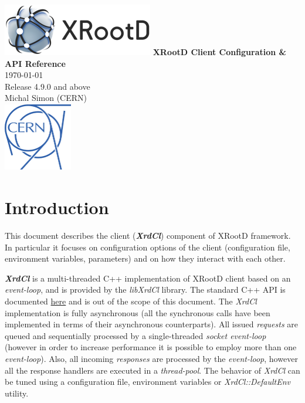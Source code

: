 \documentclass{article}
\begin{document}
\begin{titlepage}

    \centering
    \vfill
    	\includegraphics{xrootd-logo.png}
    \vfill
    	{\huge \textbf{XRootD Client Configuration \& API Reference} \\}
        \vskip3cm
        \today \\
        Release 4.9.0 and above \\
        Michal Simon (CERN) \\
        \vskip0.2cm
        \includegraphics[width=3cm, height=3cm]{cern-logo.png}
    \vfill
    \vfill

\end{titlepage}

\tableofcontents

\newpage

\section{Introduction}
    
    This document describes the client (\textit{\textbf{XrdCl}}) component of XRootD framework. In particular it focuses
    on configuration options of the client (configuration file, environment variables, parameters) and on how they
    interact with each other.
    
    \textit{\textbf{XrdCl}} is a multi-threaded C++ implementation of XRootD client based on an \textit{event-loop}, and is provided 
    by the \textit{libXrdCl} library. The standard C++ API is documented \href{http://xrootd.org/doc/doxygen/current/html/annotated.html}
	{here} and is out of the scope of this document. The \textit{XrdCl} implementation is fully asynchronous (all the synchronous 
	calls have been implemented in terms of their asynchronous counterparts). All issued \textit{requests} are queued and sequentially 
	processed by a single-threaded \textit{socket event-loop} (however in order to increase performance it is possible to employ more 
	than one \textit{event-loop}). Also, all incoming \textit{responses} are processed by the \textit{event-loop}, however all the 
	response handlers are executed in a \textit{thread-pool}. The behavior of \textit{XrdCl} can be tuned using a configuration file,
	environment variables or \textit{XrdCl::DefaultEnv} utility. 
	
\end{document}
